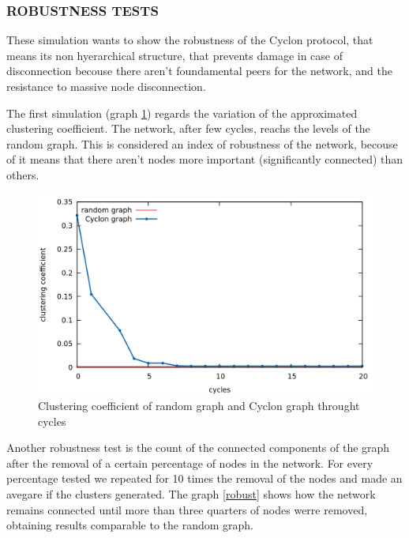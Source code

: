 \documentclass[a4paper,12pt,notitlepage]{article} %
\begin{document}
\subsubsection{ROBUSTNESS TESTS}
These simulation wants to show the robustness of the Cyclon protocol, that means its non
 hyerarchical structure, that prevents damage in case of disconnection becouse there aren't
 foundamental peers for the network, and the resistance to massive node disconnection.

The first simulation (graph \ref{clust}) regards the variation of the approximated clustering coefficient. The network,
 after few cycles, reachs the levels of the random graph. This is considered an index of robustness of the 
 network, becouse of it means that there aren't nodes more important (significantly connected) than others.

\begin{figure} [H]
	\centering
	\includegraphics[width=1\textwidth]{img/clustering}
	\caption{Clustering coefficient of random graph and Cyclon graph throught  cycles }
	\label{clust}
\end{figure}


Another robustness test is the count of the connected components of the graph after the removal of a certain 
 percentage of nodes in the network. For every percentage tested we repeated for 10 times the removal of the
 nodes and made an avegare if the clusters generated. The graph \ref{robust} shows how the network remains
 connected until more than three quarters of nodes werre removed, obtaining results comparable to the random
 graph.
 
\end{document}
